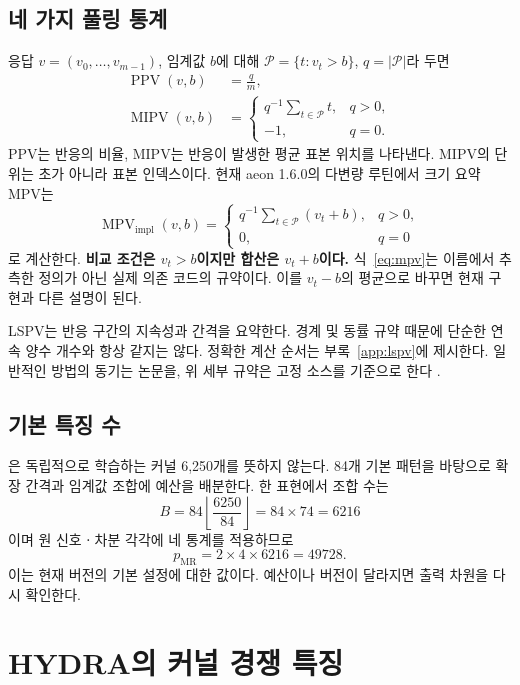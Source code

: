 \documentclass[11pt,a4paper]{article}
\newcommand{\code}[1]{\texttt{\detokenize{#1}}}
\DeclareMathOperator{\MR}{MR}
\DeclareMathOperator{\PPV}{PPV}
\DeclareMathOperator{\MPV}{MPV}
\DeclareMathOperator{\MIPV}{MIPV}
\numberwithin{equation}{section}
\begin{document}
\subsection{네 가지 풀링 통계}
응답 \(v=(v_0,\ldots,v_{m-1})\), 임계값 \(b\)에 대해
\(\mathcal P=\{t:v_t>b\}\), \(q=|\mathcal P|\)라 두면
\begin{align}
 \PPV(v,b)&=\frac qm,\\
 \MIPV(v,b)&=\begin{cases}q^{-1}\sum_{t\in\mathcal P}t,&q>0,\\-1,&q=0.\end{cases}
\end{align}
PPV는 반응의 비율, MIPV는 반응이 발생한 평균 표본 위치를 나타낸다.
MIPV의 단위는 초가 아니라 표본 인덱스이다.
현재 aeon 1.6.0의 다변량 루틴에서 크기 요약 MPV는
\begin{equation}
 \MPV_{\mathrm{impl}}(v,b)
 =\begin{cases}
 q^{-1}\sum_{t\in\mathcal P}(v_t+b),&q>0,\\
 0,&q=0
 \end{cases}\label{eq:mpv}
\end{equation}
로 계산한다.
\textbf{비교 조건은 \(v_t>b\)이지만 합산은 \(v_t+b\)이다.}
식~\eqref{eq:mpv}는 이름에서 추측한 정의가 아닌 실제 의존 코드의 규약이다.
이를 \(v_t-b\)의 평균으로 바꾸면 현재 구현과 다른 설명이 된다.

LSPV는 반응 구간의 지속성과 간격을 요약한다.
경계 및 동률 규약 때문에 단순한 연속 양수 개수와 항상 같지는 않다.
정확한 계산 순서는 부록~\ref{app:lspv}에 제시한다.
일반적인 방법의 동기는 논문을, 위 세부 규약은 고정 소스를 기준으로 한다
\cite{multirocket,aeonmr}.

\subsection{기본 특징 수}
\code{mr_kernels=6250}은 독립적으로 학습하는 커널 6,250개를 뜻하지 않는다.
84개 기본 패턴을 바탕으로 확장 간격과 임계값 조합에 예산을 배분한다.
한 표현에서 조합 수는
\begin{equation}
 B=84\left\lfloor\frac{6250}{84}\right\rfloor=84\times74=6216
\end{equation}
이며 원 신호ㆍ차분 각각에 네 통계를 적용하므로
\begin{equation}
 p_{\MR}=2\times4\times6216=49728.
\end{equation}
이는 현재 버전의 기본 설정에 대한 값이다.
예산이나 버전이 달라지면 출력 차원을 다시 확인한다.

\section{HYDRA의 커널 경쟁 특징}
\end{document}
